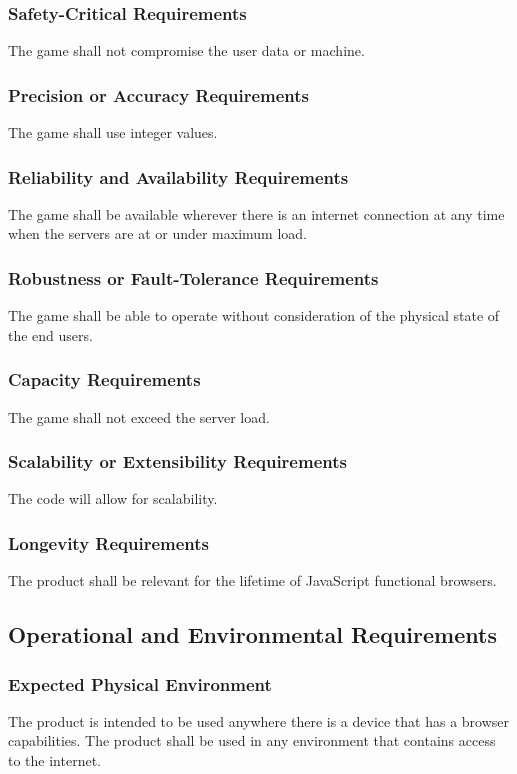 \documentclass[11pt, oneside]{article}   	%
\begin{document}
\subsubsection*{Safety-Critical Requirements}
The game shall not compromise the user data or machine.


\subsubsection*{Precision or Accuracy Requirements}
The game shall use integer values.


\subsubsection*{Reliability and Availability Requirements}
The game shall be available wherever there is an internet connection at any time when the servers are at or under maximum load.


\subsubsection*{Robustness or Fault-Tolerance Requirements}
The game shall be able to operate without consideration of the physical state of the end users.


\subsubsection*{Capacity Requirements}
The game shall not exceed the server load.


\subsubsection*{Scalability or Extensibility Requirements}
The code will allow for scalability.


\subsubsection*{Longevity Requirements}
The product shall be relevant for the lifetime of JavaScript functional browsers.


\subsection*{Operational and Environmental Requirements}
\subsubsection*{Expected Physical Environment}
The product is intended to be used anywhere there is a device that has a browser capabilities. The product shall be used in any environment that contains access to the internet.
\end{document}
